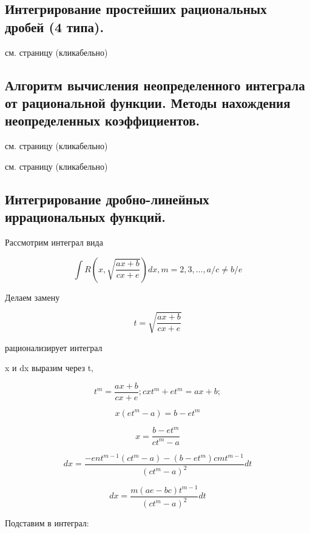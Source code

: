 \documentclass[a4paper,12pt]{article}
\theoremstyle{plain} %
\theoremstyle{definition} %
\theoremstyle{remark} %
\begin{document}
\newpage
\subsection*{Интегрирование простейших рациональных дробей (4 типа).}

см. страницу \pageref{easiest_ints} (кликабельно)

\newpage
\subsection*{Алгоритм вычисления неопределенного интеграла от рациональной функции. Методы нахождения неопределенных коэффициентов.}

см. страницу \pageref{algo_rac_int} (кликабельно)

см. страницу \pageref{methods} (кликабельно)



\newpage
\subsection*{Интегрирование дробно-линейных иррациональных функций.                                       }

Рассмотрим интеграл вида

\[
	\int R\left(x, \sqrt{\frac{ax + b}{cx + e}} \right) dx, m = 2, 3, \dots, a/c \neq b/e
\]

Делаем замену

\[
	t = \sqrt{\frac{ax + b}{cx + e}}
\]

рационализирует интеграл

x и dx выразим через t,

\[
	t^m = \frac{ax + b}{cx + e}; cxt^m + et^m = ax + b;
\]

\[
	x(et^m - a) = b - et^m
\]

\[
	x = \frac{b - et^m}{ct^m - a}
\]

\[
	dx = \frac{-ent^{m-1}(ct^m - a) - (b - et^m)cmt^{m-1}}{(ct^m  - a)^2} dt
\]

\[
	dx = \frac{m(ae - bc)t^{m-1}}{(ct^m - a)^2}dt
\]

Подставим в интеграл:
\end{document}
